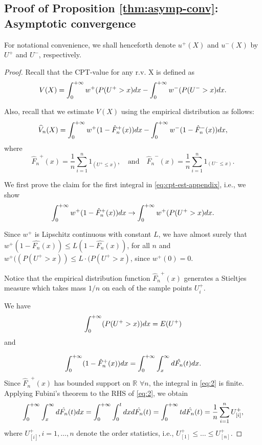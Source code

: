 \subsection*{Proof of Proposition \ref{thm:asymp-conv}: Asymptotic convergence}
For notational convenience, we shall henceforth denote $u^+(X)$ and $u^-(X)$ by $U^+$ and $U^-$, respectively. 
\begin{proof}
Recall that the CPT-value for any r.v. X is defined as
\begin{align*}
V(X) = \int_0^{+\infty} w^+(P(U^+>x) dx - \int_0^{+\infty} w^-(P(U^->x) dx. 
\end{align*} 

Also, recall that we estimate $V(X)$ using the empirical distribution as follows:
\begin{align}
\label{eq:cpt-est-appendix}
\widehat V_n(X) = \int_0^{+\infty} w^+(1-{\hat F_n}^+(x))  dx - \int_0^{+\infty} w^-(1-{\hat F_n}^-(x))  dx,
\end{align}
where 
$$
{\hat F_n}^+(x)=\frac{1}{n} \sum_{i=1}^n 1_{(U^+ \leq x)}, \quad\text{and}\quad {\hat F_n}^-(x)=\frac{1}{n} \sum_{i=1}^n 1_{(U^- \leq x)}.
$$

We first prove the claim for the first integral in \eqref{eq:cpt-est-appendix}, i.e., we show
\begin{align}
\int_0^{+\infty} w^+(1-{\hat F_n}^+(x))  dx \rightarrow \int_0^{+\infty} w^+(P(U^+>x) dx.\label{eq:3}
\end{align} 

Since $w^+$ is Lipschitz continuous with constant $L$, we have almost surely that
$w^{+}(1-\hat{F_n}(x)) \leq L (1-\hat{F_n}(x))$,  
for all $n$ and 
 $w^{+}((P(U^+>x)) \leq L\cdot (P(U^+>x)$, since $w^+(0)=0$.
 
Notice that the empirical distribution function 
${\hat F_n}^+(x)$ 
generates a Stieltjes measure which takes mass 
$1/n$ on each of the sample points $U^+_i$. 

We have
$$\int_0^{+\infty} (P(U^+>x))  dx = E(U^+)$$
and

\begin{equation}
\int_0^{+\infty} (1-{\hat F_n}^+(x))  dx =\int_0^{+\infty} \int_x^\infty d \hat{F_n}(t) dx.\label{eq:2}
\end{equation}
Since ${\hat F_n}^+(x)$ has bounded support on $\mathbb{R}$ $\forall n$, the integral in \eqref{eq:2} is finite.
Applying Fubini's theorem to the RHS of \eqref{eq:2}, we obtain
\begin{equation}
\int_0^{+\infty} \int_x^\infty d \hat{F_n}(t) dx = \int_0^{+\infty} \int_0^t dx d \hat{F_n}(t) = \int_0^{+\infty} t d\hat{F_n}(t) = \frac{1}{n} \sum_{i=1}^n U^+_{[i]},
 \end{equation}
 where $U^+_{[i]}, i=1,\ldots,n$ denote the order statistics, i.e., $U^+_{[1]} \le \ldots \le U^+_{[n]}$.
 

\end{proof}
